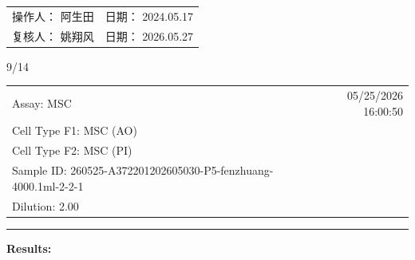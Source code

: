 \documentclass[UTF8,10pt,a4paper,fontset=fandol]{ctexart}
\newcommand{\fieldvalue}[1]{#1}
\newcommand{\handwritten}[1]{#1}
\begin{document}
\begin{flushleft}
\vfill

\begin{tabular}{p{}p{}}
操作人：
\fieldvalue{\handwritten{阿生田}}
&
日期：
\fieldvalue{\handwritten{2024.05.17}}
\\[0.5em]
复核人：
\fieldvalue{\handwritten{姚翔风}}
&
日期：
\fieldvalue{\handwritten{2026.05.27}}
\end{tabular}

\vspace{1.5em}

\handwritten{9/14}
\end{flushleft}

\newpage

\noindent
\begin{tabularx}{\textwidth}{@{}lXr@{}}
Assay:
\fieldvalue{MSC}
&
&
\fieldvalue{05/25/2026 16:00:50}
\\[0.4em]
Cell Type F1:
\fieldvalue{MSC (AO)}
&
&
\\
Cell Type F2:
\fieldvalue{MSC (PI)}
&
&
\\[0.4em]
Sample ID:
\fieldvalue{260525-A372201202605030-P5-fenzhuang-4000.1ml-2-2-1}
&
&
\\
Dilution:
\fieldvalue{2.00}
&
&
\end{tabularx}

\vspace{0.8em}
\hrule
\vspace{0.5em}

\textbf{Results:}
\end{document}
